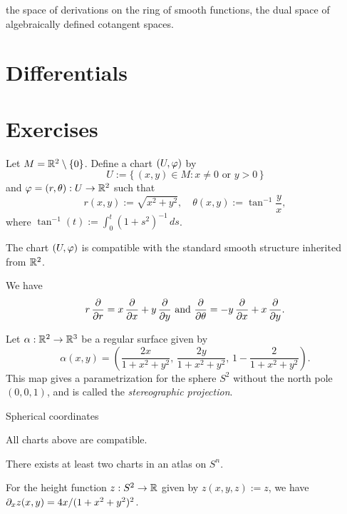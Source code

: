 \documentclass{../note}
\def\a{\alpha}
\begin{document}
\begin{prb}
\end{prb}
\begin{prb}
\end{prb}
the space of derivations on the ring of smooth functions,
the dual space of algebraically defined cotangent spaces.












\section{Differentials}







\section*{Exercises}
\setcounter{prb}{0}
\begin{prb}
Let $M=\mathbb{R}^2\setminus\{0\}$.
Define a chart $(U,\varphi)$ by
\[U:=\{\,(x,y)\in M:x\ne0\text{ or }y>0\,\}\]
and $\varphi=(r,\theta):U\to\mathbb{R}^2$ such that
\[r(x,y):=\sqrt{x^2+y^2},\quad\theta(x,y):=\tan^{-1}\frac yx,\]
where $\tan^{-1}(t):=\int_0^t(1+s^2)^{-1}\,ds$.
\begin{parts}
\item The chart $(U,\varphi)$ is compatible with the standard smooth structure inherited from $\mathbb{R}^2$.
\item We have
\[r\,\pd{r}=x\,\pd{x}+y\,\pd{y}\text{ and }\pd{\theta}=-y\,\pd{x}+x\,\pd{y}.\]
\end{parts}
\end{prb}

\begin{prb}[Spheres]
Let $\a:\R^2\to\R^3$ be a regular surface given by
\[\a(x,y)=\left(\frac{2x}{1+x^2+y^2},\,\frac{2y}{1+x^2+y^2},\,1-\frac2{1+x^2+y^2}\right).\]
This map gives a parametrization for the sphere $S^2$ without the north pole $(0,0,1)$, and is called the \emph{stereographic projection}.

Spherical coordinates
\begin{parts}
\item All charts above are compatible.
\item There exists at least two charts in an atlas on $S^n$.
\item For the height function $z:S^2\to\mathbb{R}$ given by $z(x,y,z):=z$, we have $\pd_xz(x,y)=4x/(1+x^2+y^2)^2$.
\end{parts}
\end{prb}
\end{document}
